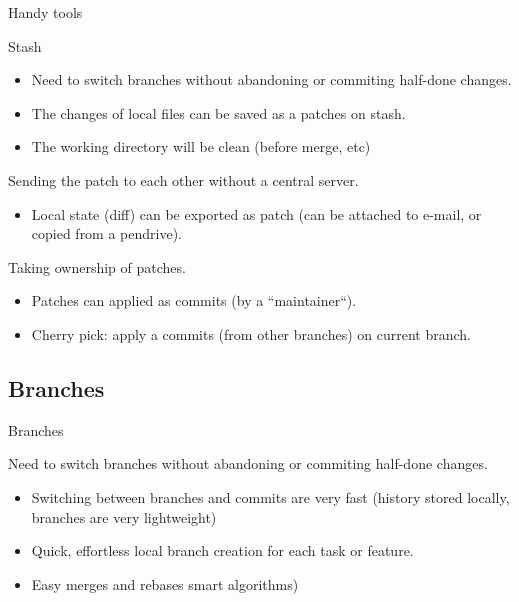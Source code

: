 \documentclass{beamer}
\begin{document}
\begin{frame}{Handy tools}

\begin{block}{Stash}
\begin{itemize}
 \item Need to switch branches without abandoning or commiting half-done changes.
 \item The changes of local files can be saved as a patches on stash.
 \item The working directory will be clean (before merge, etc)
\end{itemize}
\end{block}

\begin{block}{Sending the patch to each other without a central server.}
\begin{itemize}
 \item Local state (diff) can be exported as patch (can be attached to e-mail, or copied from a pendrive).
\end{itemize}
\end{block}

\begin{block}{Taking ownership of patches.}
\begin{itemize}
 \item Patches can applied as commits (by a ``maintainer``).
 \item Cherry pick: apply a commits (from other branches) on current branch.
\end{itemize}
\end{block}

\end{frame}


\subsection{Branches}

\begin{frame}{Branches}

\begin{block}{Need to switch branches without abandoning or commiting half-done changes.}
\begin{itemize}
 \item Switching between branches and commits are very fast (history stored locally, branches are very lightweight)
 \item Quick, effortless local branch creation for each task or feature.
 \item Easy merges and rebases  smart algorithms)
\end{itemize}
\end{block}

\end{frame}
\end{document}
